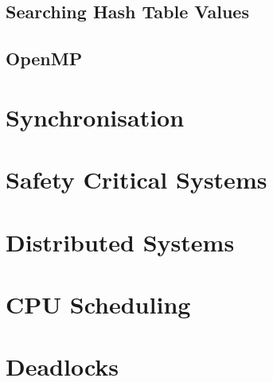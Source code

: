 \documentclass[oneside]{book}
\begin{document}
            \subsection{Searching Hash Table Values}
            \subsection{OpenMP}
        \section{Synchronisation}
        \section{Safety Critical Systems}
        \section{Distributed Systems}
        \section{CPU Scheduling}
        \section{Deadlocks}
\end{document}
